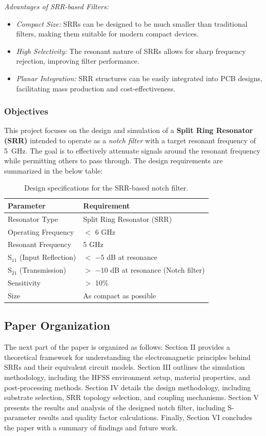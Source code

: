 \documentclass[conference]{IEEEtran}
\begin{document}
\textit{Advantages of SRR-based Filters:}
\begin{itemize}
    \item \textit{Compact Size:} SRRs can be designed to be much smaller than traditional filters, making them suitable for modern compact devices.
    \item \textit{ High Selectivity:} The resonant nature of SRRs allows for sharp frequency rejection, improving filter performance.
    \item \textit{Planar Integration:} SRR structures can be easily integrated into PCB designs, facilitating mass production and cost-effectiveness.
\end{itemize}
\subsubsection{Objectives}
This project focuses on the design and simulation of a \textbf{Split Ring Resonator (SRR)} intended to operate as a \textit{notch filter} with a target resonant frequency of 5~GHz. The goal is to effectively attenuate signals around the resonant frequency while permitting others to pass through. The design requirements are summarized in the below table:

\begin{table}[ht]
\centering
\begin{tabular}{|l|l|}
\hline
\textbf{Parameter} & \textbf{Requirement} \\ \hline
Resonator Type     & Split Ring Resonator (SRR) \\ \hline
Operating Frequency & $ < $ 6 GHz \\ \hline
Resonant Frequency  & 5 GHz \\ \hline
S$_{11}$ (Input Reflection) & $<$ $-5$ dB at resonance \\ \hline
S$_{21}$ (Transmission) &$ >$ $-10$ dB at resonance (Notch filter) \\ \hline
Sensitivity         & $> $ 10\% \\ \hline
Size                & As compact as possible \\ \hline
\end{tabular}
\caption*{Design specifications for the SRR-based notch filter.}
\end{table}

\subsection{Paper Organization}
The next part of the paper is organized as follows: Section II provides a theoretical framework for understanding the electromagnetic principles behind SRRs and their equivalent circuit models. Section III outlines the simulation methodology, including the HFSS environment setup, material properties, and post-processing methods. Section IV details the design methodology, including substrate selection, SRR topology selection, and coupling mechanisms. Section V presents the results and analysis of the designed notch filter, including S-parameter results and quality factor calculations. Finally, Section VI concludes the paper with a summary of findings and future work.
\end{document}
